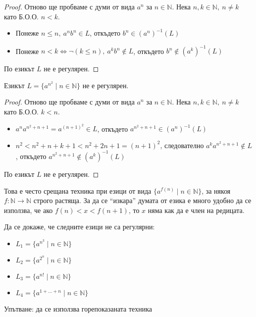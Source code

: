 \begin{proof}
    Отново ще пробваме с думи от вида $a^n$ за $n \in \mathbb{N}$.
    Нека $n, k \in \mathbb{N}, \: n \neq k$ като Б.О.О. $n < k$.
    \begin{itemize}
        \item Понеже $n \leq n, \: a^nb^n \in L$, откъдето $b^n \in (a^n)^{-1}(L)$
        \item Понеже $n < k \iff \neg(k \leq n), \: a^kb^n \notin L$, откъдето $b^n \notin (a^k)^{-1}(L)$
    \end{itemize}
    По  езикът $L$ не е регулярен.
\end{proof}

\begin{claim}
    Езикът $L = \{ a^{n^2} \mid n \in \mathbb{N} \}$ не е регулярен.
\end{claim}

\begin{proof}
    Отново ще пробваме с думи от вида $a^n$ за $n \in \mathbb{N}$.
    Нека $n, k \in \mathbb{N}, \: n \neq k$ като Б.О.О. $k < n$.
    \begin{itemize}
        \item $a^na^{n^2+n+1} = a^{(n+1)^2} \in L$, откъдето $a^{n^2+n+1} \in (a^n)^{-1}(L)$
        \item $n^2 < n^2+n+k+1 < n^2+2n+1=(n+1)^2$, следователно $a^ka^{n^2+n+1} \notin L$, откъдето $a^{n^2+n+1} \notin (a^k)^{-1}(L)$
    \end{itemize}
    По  езикът $L$ не е регулярен.
\end{proof}

Това е често срещана техника при езици от вида $\{ a^{f(n)} \mid n \in \mathbb{N} \}$, за някоя $f : \mathbb{N} \rightarrow \mathbb{N}$ строго растяща.
За да се ``изкара'' думата от езика е много удобно да се използва, че ако $f(n) < x < f(n+1)$, то $x$ няма как да е член на редицата.

\begin{problem}
Да се докаже, че следните езици не са регулярни:
\begin{itemize}
    \item $L_1 = \{ a^{n^3} \mid n \in \mathbb{N} \}$
    \item $L_2 = \{ a^{2^n} \mid n \in \mathbb{N} \}$
    \item $L_3 = \{ a^{n!} \mid n \in \mathbb{N} \}$
    \item $L_4 = \{ a^{1 + \dots + n} \mid n \in \mathbb{N} \}$
\end{itemize}
Упътване: да се използва горепоказаната техника
\end{problem}

